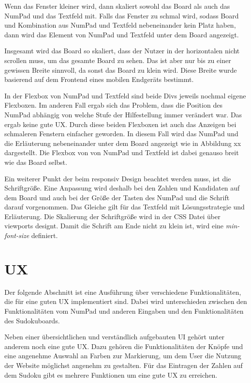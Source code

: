 Wenn das Fenster kleiner wird, dann skaliert sowohl das Board als auch das NumPad und das Textfeld mit. Falls das Fenster zu schmal wird, sodass Board und Kombination aus NumPad und Textfeld nebeneinander kein Platz haben, dann wird das Element von NumPad und Textfeld unter dem Board angezeigt.

Insgesamt wird das Board so skaliert, dass der Nutzer in der horizontalen nicht scrollen muss, um das gesamte Board zu sehen. Das ist aber nur bis zu einer gewissen Breite sinnvoll, da sonst das Board zu klein wird. Diese Breite wurde basierend auf dem Frontend eines mobilen Endgeräts bestimmt.

In der Flexbox von NumPad und Textfeld sind beide Divs jeweils nochmal eigene Flexboxen. Im anderen Fall ergab sich das Problem, dass die Position des NumPad abhängig von welche Stufe der Hilfestellung immer verändert war. Das ergab keine gute \ac{UX}. Durch diese beiden Flexboxen ist auch das Anzeigen bei schmaleren Fenstern einfacher geworden. In diesem Fall wird das NumPad und die Erläuterung nebeneinander unter dem Board angezeigt wie in Abbildung xx dargestellt. Die Flexbox von von NumPad und Textfeld ist dabei genauso breit wie das Board selbst.


Ein weiterer Punkt der beim responsiv Design beachtet werden muss, ist die Schriftgröße. Eine Anpassung wird deshalb bei den Zahlen und Kandidaten auf dem Board und auch bei der Größe der Tasten des NumPad und die Schrift darauf vorgenommen. Das Gleiche gilt für das Textfeld mit Lösungsstrategie und Erläuterung. Die Skalierung der Schriftgröße wird in der \ac{CSS} Datei über viewports designt. Damit die Schrift am Ende nicht zu klein ist, wird eine \textit{min-font-size} definiert. 


\section{\acl{UX}}
Der folgende Abschnitt ist eine Ausführung über verschiedene Funktionalitäten, die für eine guten \acl{UX} implementiert sind. Dabei wird unterschieden zwischen den Funktionalitäten vom NumPad und anderen Eingaben und den Funktionalitäten des Sudokuboards.

Neben einer übersichtlichen und verständlich aufgebauten \ac{UI} gehört unter anderem noch eine gute \ac{UX}. Dazu gehören die Funktionalitäten der Knöpfe und eine angenehme Auswahl an Farben zur Markierung, um dem User die Nutzung der Website möglichst angenehm zu gestalten. Für das Eintragen der Zahlen auf dem Sudoku gibt es mehrere Funktionen um eine gute \ac{UX} zu erreichen. 

